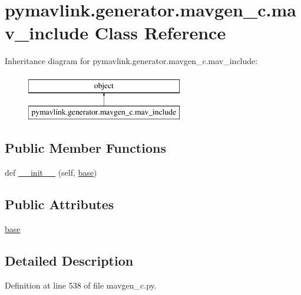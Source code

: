 \hypertarget{classpymavlink_1_1generator_1_1mavgen__c_1_1mav__include}{}\section{pymavlink.\+generator.\+mavgen\+\_\+c.\+mav\+\_\+include Class Reference}
\label{classpymavlink_1_1generator_1_1mavgen__c_1_1mav__include}
Inheritance diagram for pymavlink.\+generator.\+mavgen\+\_\+c.\+mav\+\_\+include\+:\begin{figure}[H]
\begin{center}
\leavevmode
\includegraphics[height=2.000000cm]{classpymavlink_1_1generator_1_1mavgen__c_1_1mav__include}
\end{center}
\end{figure}
\subsection*{Public Member Functions}
\begin{DoxyCompactItemize}
\item 
def \mbox{\hyperlink{classpymavlink_1_1generator_1_1mavgen__c_1_1mav__include_a5cf023f53ba8bf561b4dfe7f7677dffd}{\+\_\+\+\_\+init\+\_\+\+\_\+}} (self, \mbox{\hyperlink{classpymavlink_1_1generator_1_1mavgen__c_1_1mav__include_a4b156838c0def042a0fbfa72b890f7cb}{base}})
\end{DoxyCompactItemize}
\subsection*{Public Attributes}
\begin{DoxyCompactItemize}
\item 
\mbox{\hyperlink{classpymavlink_1_1generator_1_1mavgen__c_1_1mav__include_a4b156838c0def042a0fbfa72b890f7cb}{base}}
\end{DoxyCompactItemize}


\subsection{Detailed Description}


Definition at line 538 of file mavgen\+\_\+c.\+py.



